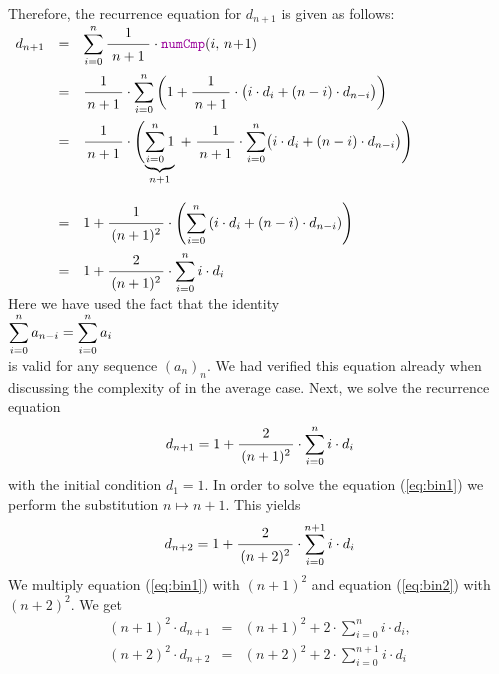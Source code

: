 Therefore, the recurrence equation for $d_{n+1}$ is given as follows: 
\\[0.2cm]
\hspace*{1.3cm}
$
\begin{array}{lcl}
d_{n+1} 
& = &  
\ds\sum\limits_{i=0}^n \bruch{1}{\,n+1\,} \cdot \mytt{numCmp}(i,\,n\!+\!1)  \\[0.5cm]
& = &  
\ds\bruch{1}{n+1} \cdot \sum\limits_{i=0}^n  
           \left(1 + \bruch{1}{n+1} \cdot \bigl(i \cdot d_i + (n-i) \cdot d_{n-i} \bigr) \right)
\\[0.5cm]
& = &  
\bruch{1}{n+1} \cdot \Biggl(\underbrace{\sum\limits_{i=0}^n 1}_{n+1} \;+\;
           \bruch{1}{n+1} \cdot \ds\sum\limits_{i=0}^n \bigl(i \cdot d_i + (n-i) \cdot d_{n-i} \bigr) \Biggr)
\\[1.3cm]
& = &  
1 + \bruch{1}{(n+1)^2} \cdot \left(\ds\sum\limits_{i=0}^n \left(i\cdot d_i + (n-i)\cdot d_{n-i}\right) \right) 
\\[0.5cm]
& = &  
1 + \bruch{2}{(n+1)^2} \cdot \ds\sum\limits_{i=0}^n i\cdot d_i 
\end{array}
$
\\[0.2cm]
Here we have used the fact that the identity  \\[0.2cm]
\hspace*{1.3cm}
$\displaystyle\sum\limits_{i=0}^n a_{n-i} = \sum\limits_{i=0}^n a_i$ \\[0.2cm]
is valid for any sequence $(a_n)_{n}$.
We had verified this equation already when discussing the complexity of  in the average
case.  Next, we solve the recurrence equation 
\begin{equation}
  \label{eq:bin1}
d_{n+1} = \displaystyle 1 + \bruch{2}{(n+1)^2} \cdot \sum\limits_{i=0}^n i\cdot d_i  
\end{equation}
with the initial condition $d_1 = 1$.  
In order to solve the equation (\ref{eq:bin1}) we perform the substitution $n \mapsto n+1$.  This yields
\begin{equation}
  \label{eq:bin2}
d_{n+2} = \displaystyle 1 + \bruch{2}{(n+2)^2} \cdot \sum\limits_{i=0}^{n+1} i\cdot d_i  
\end{equation}
We multiply equation (\ref{eq:bin1}) with $(n+1)^2$ and equation (\ref{eq:bin2}) 
with $(n+2)^2$.  We get
\begin{eqnarray}
  \label{eq:bin3}
(n+1)^2 \cdot d_{n+1} & = & (n+1)^2 + 2 \cdot \sum\limits_{i=0}^n i\cdot d_i, \\
  \label{eq:bin4}
(n+2)^2 \cdot d_{n+2} & = & (n+2)^2 + 2 \cdot \sum\limits_{i=0}^{n+1} i\cdot d_i
\end{eqnarray}

